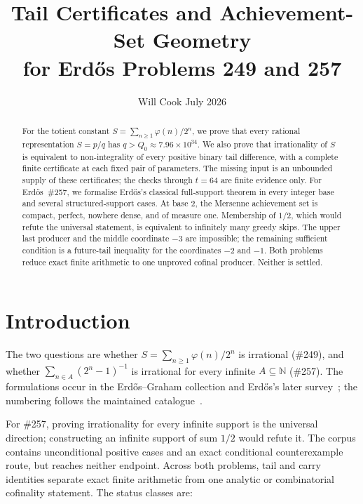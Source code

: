 \documentclass[11pt]{article}
\title{\vspace{-4em}Tail Certificates and Achievement-Set Geometry\\
{\large for Erd\H{o}s Problems 249 and 257}}
\author{Will Cook \qquad July 2026}
\date{}
\theoremstyle{definition}
\theoremstyle{remark}
\newcommand{\N}{\mathbb{N}}
\newcommand{\ph}{\varphi}
\newcommand{\Qzero}{Q_0}
\begin{document}
\sloppy
\maketitle

\begin{abstract}
\noindent
For the totient constant
$S=\sum_{n\ge1}\ph(n)/2^n$, we prove that every rational representation
$S=p/q$ has $q>\Qzero\approx7.96\times10^{34}$.  We also prove that
irrationality of $S$ is equivalent to non-integrality of every positive binary
tail difference, with a complete finite certificate at each fixed pair of
parameters.  The missing input is an unbounded supply of these certificates;
the checks through $t=64$ are finite evidence only.  For Erd\H{o}s~\#257, we
formalise Erd\H{o}s's classical full-support theorem in every integer base and
several structured-support cases.  At base $2$, the Mersenne achievement set is
compact, perfect, nowhere dense, and of measure one.  Membership of $1/2$,
which would refute the universal statement, is equivalent to infinitely many
greedy skips.  The upper last producer and the middle coordinate $-3$ are
impossible; the remaining sufficient condition is a future-tail inequality
for the coordinates $-2$ and $-1$.  Both problems reduce exact finite
arithmetic to one unproved cofinal producer.  Neither is settled.
\end{abstract}

\section{Introduction}\label{sec:intro}

The two questions are whether
$S=\sum_{n\ge1}\ph(n)/2^n$ is irrational (\#249), and whether
$\sum_{n\in A}(2^n-1)^{-1}$ is irrational for every infinite
$A\subseteq\N$ (\#257).  The formulations occur in the Erd\H{o}s--Graham
collection and Erd\H{o}s's later survey~\cite{erdosgraham1980,erdos1988};
the numbering follows the maintained catalogue~\cite{erdosproblems}.

For \#257, proving irrationality for every infinite support is the universal
direction; constructing an infinite support of sum $1/2$ would refute it.
The corpus contains unconditional positive cases and an exact conditional
counterexample route, but reaches neither endpoint.  Across both problems,
tail and carry identities separate exact finite arithmetic from one analytic
or combinatorial cofinality statement.  The status classes are:
\end{document}
